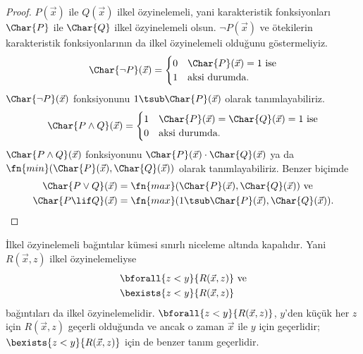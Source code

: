 \begin{proof}
  $P(\vec x)$ ile $Q(\vec x)$ ilkel özyinelemeli, yani karakteristik
  fonksiyonları $\Char{P}$ ile $\Char{Q}$ ilkel özyinelemeli olsun.
  $\lnot P(\vec x)$ ve ötekilerin karakteristik fonksiyonlarının da ilkel
  özyinelemeli olduğunu göstermeliyiz.
  \[
    \Char{\lnot P}(\vec x)=\begin{cases}
      0 & \text{$\Char{P}(\vec x)=1$ ise}\\
      1 & \text{aksi durumda.}
    \end{cases}
  \]
  $\Char{\lnot P}(\vec x)$ fonksiyonunu
  $1\tsub\Char{P}(\vec x)$ olarak tanımlayabiliriz.
  \[
    \Char{P\land Q}(\vec x)=\begin{cases}
      1 & \text{$\Char{P}(\vec x)=\Char{Q}(\vec x)=1$ ise}\\
      0 & \text{aksi durumda.}
    \end{cases}
  \]
  $\Char{P\land Q}(\vec x)$ fonksiyonunu
  $\Char{P}(\vec x)\cdot\Char{Q}(\vec x)$ ya da
  $\fn{min}(\Char{P}(\vec x),\Char{Q}(\vec x))$ olarak tanımlayabiliriz.
  Benzer biçimde
  \begin{align*}
    \Char{P\lor Q}(\vec x) & =
      \fn{max}(\Char{P}(\vec x),\Char{Q}(\vec x)) \text{ ve}\\
    \Char{P\lif Q}(\vec x) & =
      \fn{max}(1\tsub\Char{P}(\vec x),\Char{Q}(\vec x)).
  \end{align*}
\end{proof}

\begin{prop}
  İlkel özyinelemeli bağıntılar kümesi sınırlı niceleme altında kapalıdır.
  Yani $R(\vec x,z)$ ilkel özyinelemeliyse
  \begin{align*}
    & \bforall{z<y}{R(\vec x,z)} \text{ ve}\\
    & \bexists{z<y}{R(\vec x,z)}
  \end{align*}
  bağıntıları da ilkel özyinelemelidir.
  $\bforall{z<y}{R(\vec x,z)}$, $y$'den küçük her $z$ için
  $R(\vec x,z)$ geçerli olduğunda ve ancak o zaman $\vec x$ ile $y$ için
  geçerlidir; $\bexists{z<y}{R(\vec x,z)}$ için de benzer tanım geçerlidir.
\end{prop}

